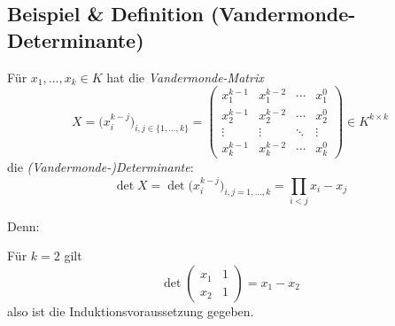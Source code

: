  \subsection{Beispiel \& Definition (Vandermonde-Determinante)}
 	\begin{Definition}
 		Für $ x_1,\dots, x_k\in K $ hat die \emph{Vandermonde-Matrix}
 		\[
 			X= \big(x_i^{k-j}\big)_{i,j\in \{1,\dots, k \}} =
 			\begin{pmatrix}
 				x_1^{k-1} & x_1^{k-2} & \cdots & x_1^0  \\
 				x_2^{k-1} & x_2^{k-2} & \cdots & x_2^0  \\
 				\vdots    & \vdots    & \ddots & \vdots \\
 				x_k^{k-1} & x_k^{k-2} & \cdots & x_k^0
 			\end{pmatrix}
 			\in K^{k\times k}
 		\]
 		die \emph{(Vandermonde-)Determinante}:
 		\[
 			\det X = \det \big(x_i^{k-j}\big)_{i,j = 1,\dots, k} = \prod_{i<j}x_i-x_j
 		\]

 		Denn:

 		Für $ k=2 $ gilt
 		\[
 			\det
 			\begin{pmatrix}
 				x_1 & 1 \\x_2&1
 			\end{pmatrix}
 			= x_1-x_2
 		\]
 		also ist die Induktionsvoraussetzung gegeben.


\end{Definition}
